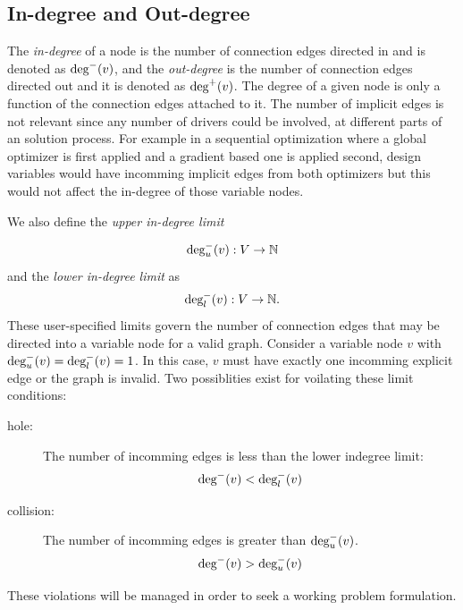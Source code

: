 \subsection{In-degree and Out-degree}
\label{s:indegree-outdegree}
The \emph{in-degree} of a node is the number of connection edges directed in and 
is denoted as $\textrm{deg}^-(v)$, and the \emph{out-degree} 
is the number of connection edges directed out and it is denoted as $\textrm{deg}^+(v)$.
The degree of a given node is only a function of the connection edges 
attached to it. The number of implicit edges is not relevant since any number 
of drivers could be involved, at different parts of an solution process. For 
example in a sequential optimization where a global optimizer is first applied
and a gradient based one is applied second, design variables would have incomming 
implicit edges from both optimizers but this would not affect the in-degree of those
variable nodes. 

We also define the \emph{upper in-degree limit} 

\begin{equation}
\textrm{deg}_u^-(v):V \to \mathbb{N}
\end{equation} 
and the \emph{lower in-degree limit} as
\begin{equation}
\textrm{deg}_l^-(v):V \to \mathbb{N}.
\end{equation}
These user-specified limits govern the number of connection edges that may be directed into a variable
node for a valid graph. Consider a variable node $v$ with
$\textrm{deg}_u^-(v) = \textrm{deg}_l^-(v) = 1$. In this case, $v$ must have exactly one
incomming explicit edge or the graph is invalid. Two possiblities exist for voilating 
these limit conditions: 
\begin{description}
  \item[hole: ] The number of incomming edges is less than the lower indegree limit:
    \begin{equation} \textrm{deg}^-(v) < \textrm{deg}_l^-(v) \label{e:hole} \end{equation} 

  \item[collision: ] The number of incomming edges is greater than $ \textrm{deg}_u^-(v)$. 
    \begin{equation} \textrm{deg}^-(v) > \textrm{deg}_u^-(v) \end{equation}
\end{description} 
These violations will be managed in order to seek a working problem formulation.

